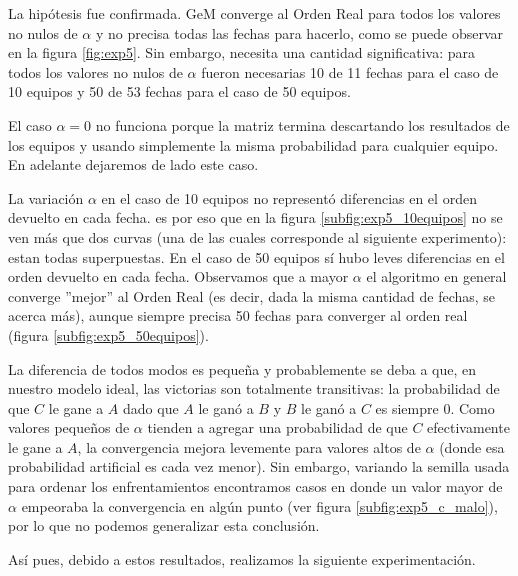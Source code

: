 \par La hip\'otesis fue confirmada. GeM converge al Orden Real para todos los
valores no nulos de $\alpha$ y no precisa todas las fechas para hacerlo, como se
puede observar en la figura \ref{fig:exp5}. Sin embargo, necesita una cantidad
significativa: para todos los valores no nulos de $\alpha$ fueron necesarias 10
de 11 fechas para el caso de 10 equipos y 50 de 53 fechas para el caso de 50
equipos.

\par El caso $\alpha=0$ no funciona porque la matriz termina descartando los
resultados de los equipos y usando simplemente la misma probabilidad para
cualquier equipo. En adelante dejaremos de lado este caso.

\par La variaci\'on $\alpha$ en el caso de 10 equipos no represent\'o
diferencias en el orden devuelto en cada fecha. es por eso que en la figura
\ref{subfig:exp5_10equipos} no se ven m\'as que dos curvas (una de las cuales
corresponde al siguiente experimento): estan todas superpuestas. En el caso de
50 equipos s\'i hubo leves diferencias en el orden devuelto en cada fecha.
Observamos que a mayor $\alpha$ el algoritmo en general converge ''mejor'' al
Orden Real (es decir, dada la misma cantidad de fechas, se acerca m\'as), aunque
siempre precisa 50 fechas para converger al orden real (figura
\ref{subfig:exp5_50equipos}).

\par La diferencia de todos modos es peque\~na y probablemente se deba a que, en
nuestro modelo ideal, las victorias son totalmente transitivas: la probabilidad
de que $C$ le gane a $A$ dado que $A$ le gan\'o a $B$ y $B$ le ganó a $C$ es
siempre $0$.  Como valores peque\~nos de $\alpha$ tienden a agregar una
probabilidad de que $C$ efectivamente le gane a $A$, la convergencia mejora
levemente para valores altos de $\alpha$ (donde esa probabilidad artificial es
cada vez menor). Sin embargo, variando la semilla usada para ordenar los
enfrentamientos encontramos casos en donde un valor mayor de $\alpha$ empeoraba
la convergencia en alg\'un punto (ver figura \ref{subfig:exp5_c_malo}), por lo
que no podemos generalizar esta conclusi\'on.

\par As\'i pues, debido a estos resultados, realizamos la siguiente
experimentaci\'on.

